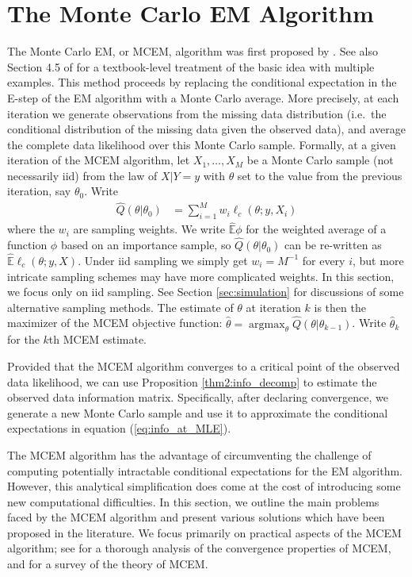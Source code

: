 \documentclass[11pt, oneside]{article}   	%
\newcommand{\bE}{\mathbb{E}}
\DeclareMathOperator*{\argmax}{argmax}
\begin{document}
\section{The Monte Carlo EM Algorithm}
\label{sec:MCEM}

The Monte Carlo EM, or MCEM, algorithm was first proposed by \citet{Wei90}. See also Section 4.5 of \citet{Tan96} for a textbook-level treatment of the basic idea with multiple examples. This method proceeds by replacing the conditional expectation in the E-step of the EM algorithm with a Monte Carlo average. More precisely, at each iteration we generate observations from the missing data distribution (i.e.\ the conditional distribution of the missing data given the observed data), and average the complete data likelihood over this Monte Carlo sample. Formally, at a given iteration of the MCEM algorithm, let $X_1,\ldots, X_M$ be a Monte Carlo sample (not necessarily iid) from the law of $X|Y=y$ with $\theta$ set to the value from the previous iteration, say $\theta_0$. Write
%
\begin{align}
    \hat{Q}(\theta|\theta_0) &= \sum_{i=1}^M w_i \ell_c(\theta; y, X_i) \label{eq:MCEM_objective}
\end{align}
%
where the $w_i$ are sampling weights. We write $\hat{\bE} \phi$ \index{$\hat{\bE}$} for the weighted average of a function $\phi$ based on an importance sample, so $\hat{Q}(\theta|\theta_0)$ can be re-written as $\hat{\bE} \ell_c (\theta; y, X)$. Under iid sampling we simply get $w_i = M^{-1}$ for every $i$, but more intricate sampling schemes may have more complicated weights. In this section, we focus only on iid sampling. See Section \ref{sec:simulation} for discussions of some alternative sampling methods. The estimate of $\theta$ at iteration $k$ is then the maximizer of the MCEM objective function: $\hat{\theta} = \argmax_\theta \hat{Q}(\theta|\theta_{k-1})$. Write $\hat{\theta}_{k}$ for the $k$th MCEM estimate. 

Provided that the MCEM algorithm converges to a critical point of the observed data likelihood, we can use Proposition \ref{thm2:info_decomp} to estimate the observed data information matrix. Specifically, after declaring convergence, we generate a new Monte Carlo sample and use it to approximate the conditional expectations in equation (\ref{eq:info_at_MLE}).

The MCEM algorithm has the advantage of circumventing the challenge of computing potentially intractable conditional expectations for the EM algorithm. However, this analytical simplification does come at the cost of introducing some new computational difficulties. In this section, we outline the main problems faced by the MCEM algorithm and present various solutions which have been proposed in the literature. We focus primarily on practical aspects of the MCEM algorithm; see \citet{For03} for a thorough analysis of the convergence properties of MCEM, and \citet{Nea13} for a survey of the theory of MCEM.
\end{document}
